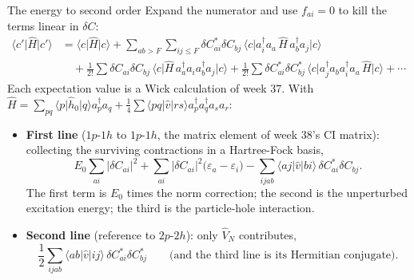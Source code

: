 \documentclass[aspectratio=169,10pt]{beamer}
\newcommand{\element}[3]{\langle #1\vert #2\vert #3\rangle}
\begin{document}
\begin{frame}{The energy to second order}
  \footnotesize
  Expand the numerator and use $f_{ai}=0$ to kill the terms linear in $\delta C$:
  \begin{align*}
    \element{c'}{\hat{H}}{c'}
    &=\element{c}{\hat{H}}{c}
    +\sum_{ab>F}\sum_{ij\le F}\delta C_{ai}^{*}\delta C_{bj}\,\element{c}{a_i^{\dagger}a_a\,\hat{H}\,a_b^{\dagger}a_j}{c}\\
    &\quad+\frac{1}{2!}\sum\delta C_{ai}\delta C_{bj}\,\element{c}{\hat{H}\,a_a^{\dagger}a_ia_b^{\dagger}a_j}{c}
    +\frac{1}{2!}\sum\delta C_{ai}^{*}\delta C_{bj}^{*}\,\element{c}{a_j^{\dagger}a_ba_i^{\dagger}a_a\,\hat{H}}{c}+\cdots
  \end{align*}
  Each expectation value is a Wick calculation of week 37. With $\hat{H}=\sum_{pq}\element{p}{\hat{h}_0}{q}a_p^{\dagger}a_q+\frac14\sum\element{pq}{\hat{v}}{rs}a_p^{\dagger}a_q^{\dagger}a_sa_r$:
  \begin{itemize}
    \item \textbf{First line} ($1p$-$1h$ to $1p$-$1h$, the matrix element of week 38's CI matrix): collecting the surviving contractions in a Hartree-Fock basis,
    \[
      E_0\sum_{ai}|\delta C_{ai}|^2+\sum_{ai}|\delta C_{ai}|^2\bigl(\varepsilon_a-\varepsilon_i\bigr)-\sum_{ijab}\element{aj}{\hat{v}}{bi}\,\delta C_{ai}^{*}\delta C_{bj} .
    \]
    The first term is $E_0$ times the norm correction; the second is the unperturbed excitation energy; the third is the particle-hole interaction.
    \item \textbf{Second line} (reference to $2p$-$2h$): only $\hat{V}_N$ contributes,
    \[
      \frac12\sum_{ijab}\element{ab}{\hat{v}}{ij}\,\delta C_{ai}^{*}\delta C_{bj}^{*}
      \qquad\text{(and the third line is its Hermitian conjugate).}
    \]
  \end{itemize}
\end{frame}
\end{document}
